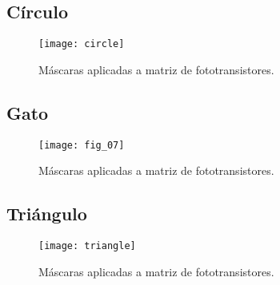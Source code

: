 \subsection{Círculo}

            \begin{figure}[hbtp]
                \centering
                \texttt{[image: circle]}
                \caption{Máscaras aplicadas a matriz de fototransistores.}
                \label{fig:circle}
            \end{figure} 
\newpage
\subsection{Gato}

            \begin{figure}[hbtp]
                \centering
                \texttt{[image: fig\_07]}
                \caption{Máscaras aplicadas a matriz de fototransistores.}
                \label{fig:fig_07}
            \end{figure} 
\newpage
\subsection{Triángulo}

            \begin{figure}[hbtp]
                \centering
                \texttt{[image: triangle]}
                \caption{Máscaras aplicadas a matriz de fototransistores.}
                \label{fig:triangle}
            \end{figure} 
